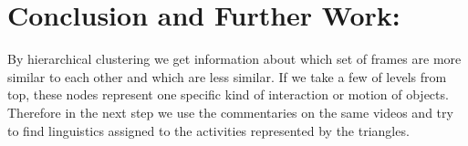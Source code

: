 \documentclass[10pt, twocolumn]{article}
\begin{document}
\section*{Conclusion and Further Work:}
By hierarchical clustering we get information about which set of frames are more similar to each other and which are less similar. If we take a few of levels from top, these nodes represent one specific kind of interaction or motion of objects. Therefore in the next step we use the commentaries on the same videos and try to find linguistics assigned to the activities represented by the triangles.


\end{document}
